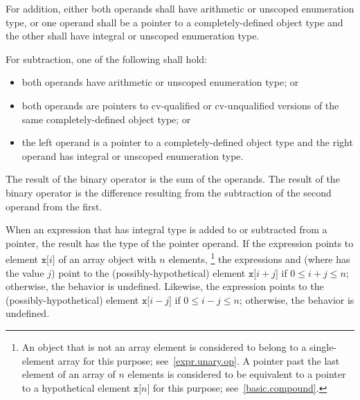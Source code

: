 %
For addition, either both operands shall have arithmetic or unscoped enumeration
type, or one operand shall be a pointer to a completely-defined object
type and the other shall have integral or unscoped enumeration type.

\pnum
For subtraction, one of the following shall hold:

\begin{itemize}
\item both operands have arithmetic or unscoped enumeration type; or

%
\item both operands are pointers to cv-qualified or cv-unqualified
versions of the same completely-defined object type; or

\item the left operand is a pointer to a completely-defined object type
and the right operand has integral or unscoped enumeration type.
\end{itemize}

\pnum
The result of the binary \tcode{+} operator is the sum of the operands.
The result of the binary \tcode{-} operator is the difference resulting
from the subtraction of the second operand from the first.

\pnum
{}%
When an expression that has integral type is added to or subtracted from
a pointer, the result has the type of the pointer operand.
If the expression  points to element $\mathtt{x[}i\mathtt{]}$
of an array object  with $n$ elements,%
\footnote{An object that is not an array element is considered to belong to a
single-element array for this purpose; see~\ref{expr.unary.op}.
A pointer past the last element of an array  of $n$ elements
is considered to be equivalent to a pointer to a hypothetical element
$\mathtt{x[}n\mathtt{]}$ for this purpose; see~\ref{basic.compound}.}
the expressions  and 
(where  has the value $j$)
point to the (possibly-hypothetical) element
$\mathtt{x[}i + j\mathtt{]}$ if $0 \le i + j \le n$;
otherwise, the behavior is undefined.
Likewise, the expression 
points to the (possibly-hypothetical) element
$\mathtt{x[}i - j\mathtt{]}$ if $0 \le i - j \le n$;
otherwise, the behavior is undefined.

